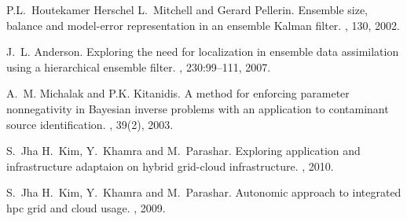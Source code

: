 \begin{thebibliography}{10}
P.L.~Houtekamer Herschel L.~Mitchell and Gerard Pellerin.
\newblock Ensemble size, balance and model-error representation in an ensemble
  {K}alman filter.
, 130,
  2002.

J.~L. Anderson.
\newblock Exploring the need for localization in ensemble data assimilation
  using a hierarchical ensemble filter.
, 230:99--111, 2007.

A.~M. Michalak and P.K. Kitanidis.
\newblock A method for enforcing parameter nonnegativity in {B}ayesian inverse
  problems with an application to contaminant source identification.
, 39(2), 2003.

S.~Jha H.~Kim, Y.~Khamra and M.~Parashar.
\newblock Exploring application and infrastructure adaptaion on hybrid
  grid-cloud infrastructure.
, 2010.

S.~Jha H.~Kim, Y.~Khamra and M.~Parashar.
\newblock Autonomic approach to integrated hpc grid and cloud usage.
, 2009.

\end{thebibliography}
